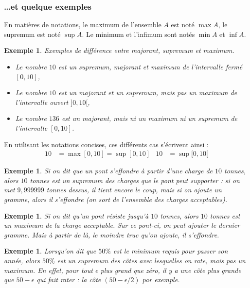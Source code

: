 \documentclass[a4paper,12pt]{book}
\theoremstyle{mes_exemples}	\newtheorem{exemple}[numtho]{Exemple}
\theoremstyle{mes_tho}
\begin{document}
\subsubsection{\ldots et quelque exemples}

En matières de notations, le maximum de l'ensemble $A$ est noté $\max A$, le supremum est noté $\sup A$. Le minimum et l'infimum sont notés $\min A$ et $\inf A$.

\begin{exemple}
Exemples de différence entre majorant, supremum et maximum.
\begin{itemize}
\item Le nombre $10$ est un supremum, majorant et maximum de l'intervalle fermé $[0,10]$,
\item Le nombre $10$ est un majorant et un supremum, mais pas un maximum de l'intervalle ouvert $]0,10[$,
\item Le nombre $136$ est un majorant, mais ni un maximum ni un supremum de l'intervalle $[0,10]$.
\end{itemize}
\end{exemple}

En utilisant les notations concises, ces différents cas s'écrivent ainsi :
\begin{align*}
10&=\max[0,10]=\sup[0,10]	& 10&=\sup[0,10[
\end{align*}


\begin{exemple}
Si on dit que un pont s'effondre à partir d'une charge de $10$ tonnes, alors $10$ tonnes est un \emph{supremum} des charges que le pont peut supporter : si on met $9,999999$ tonnes dessus, il tient encore le coup, mais si on ajoute un gramme, alors il s'effondre (on sort de l'ensemble des charges acceptables).
\end{exemple}

\begin{exemple}
Si on dit qu'un pont résiste jusqu'à $10$ tonnes, alors $10$ tonnes est un \emph{maximum} de la charge acceptable. Sur ce pont-ci, on peut ajouter le dernier gramme. Mais à partir de là, le moindre truc qu'on ajoute, il s'effondre.
\end{exemple}

\begin{exemple}
Lorsqu'on dit que $50\%$ est le minimum requis pour passer son année, alors $50\%$ est un supremum des côtes avec lesquelles on rate, mais pas un maximum. En effet, pour tout $\epsilon$ plus grand que zéro, il y a une côte plus grande que $50-\epsilon$ qui fait rater : la côte $(50-\epsilon/2)$ par exemple.
\end{exemple}
\end{document}
